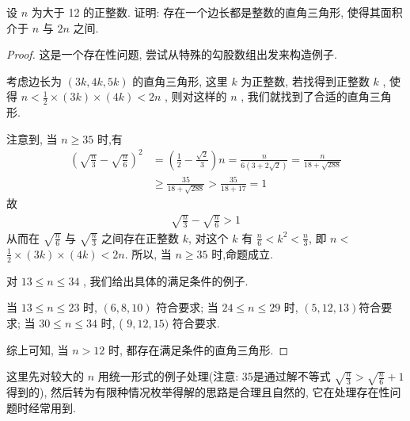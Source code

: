 \begin{example}
	设 $n$ 为大于 12 的正整数. 证明: 存在一个边长都是整数的直角三角形, 使得其面积介于 $n$ 与 $2 n$ 之间.
\end{example}
\begin{proof}
	这是一个存在性问题, 尝试从特殊的勾股数组出发来构造例子.

	考虑边长为 $(3 k, 4 k, 5 k)$ 的直角三角形, 这里 $k$ 为正整数, 若找得到正整数 $k$ , 使得 $n<\frac{1}{2} \times(3 k) \times(4 k)<2 n$ , 则对这样的 $n$ , 我们就找到了合适的直角三角形.

	注意到, 当 $n \geqslant 35$ 时,有
	\begin{align}
		\left(\sqrt{\frac{n}{3}}-\sqrt{\frac{n}{6}}\right)^{2} & =\left(\frac{1}{2}-\frac{\sqrt{2}}{3}\right) n=\frac{n}{6(3+2 \sqrt{2})}=\frac{n}{18+\sqrt{288}} \\
		                                                       & \geqslant \frac{35}{18+\sqrt{288}}>\frac{35}{18+17}=1
	\end{align}
	故
	\begin{align*}
		\sqrt{\frac{n}{3}}-\sqrt{\frac{n}{6}}>1
	\end{align*}
	从而在 $\sqrt{\frac{n}{6}}$ 与 $\sqrt{\frac{n}{3}}$ 之间存在正整数 $k$, 对这个 $k$ 有 $\frac{n}{6}<k^{2}<\frac{n}{3}$, 即 $n<$ $\frac{1}{2} \times(3 k) \times(4 k)<2 n$. 所以, 当 $n \geqslant 35$ 时,命题成立.

	对 $13 \leqslant n \leqslant 34$ , 我们给出具体的满足条件的例子.

	当 $13 \leqslant n \leqslant 23$ 时,  $(6,8,10)$ 符合要求; 当 $24 \leqslant n \leqslant 29$ 时,  $(5,12,13)$符合要求; 当 $30 \leqslant n \leqslant 34$ 时, ( $9,12,15)$ 符合要求.

	综上可知, 当 $n>12$ 时, 都存在满足条件的直角三角形.
\end{proof}
\begin{note}
	这里先对较大的 $n$ 用统一形式的例子处理(注意: 35是通过解不等式 $\sqrt{\frac{n}{3}}>\sqrt{\frac{n}{6}}+1$ 得到的), 然后转为有限种情况枚举得解的思路是合理且自然的, 它在处理存在性问题时经常用到.
\end{note}

